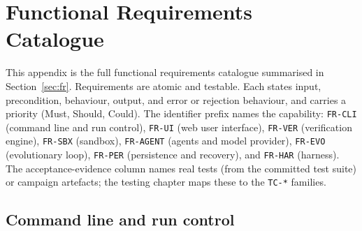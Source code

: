 \chapter{Functional Requirements Catalogue}
\label{app:requirements}

This appendix is the full functional requirements catalogue summarised in
Section~\ref{sec:fr}. Requirements are atomic and testable. Each states input, precondition,
behaviour, output, and error or rejection behaviour, and carries a priority
(Must, Should, Could). The identifier prefix names the capability:
\texttt{FR-CLI} (command line and run control), \texttt{FR-UI} (web user
interface), \texttt{FR-VER} (verification engine), \texttt{FR-SBX} (sandbox),
\texttt{FR-AGENT} (agents and model provider), \texttt{FR-EVO} (evolutionary
loop), \texttt{FR-PER} (persistence and recovery), and \texttt{FR-HAR}
(harness). The acceptance-evidence column names real tests (from the committed
test suite) or campaign artefacts; the testing chapter maps these to the
\texttt{TC-*} families.

\section{Command line and run control}
\label{sec:fr-cli}

